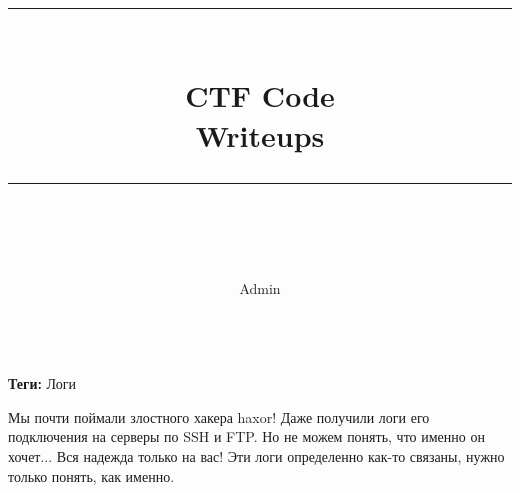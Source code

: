 \documentclass[idxtotoc,hyperref,openany,oneside]{files/admin} %
\newcommand{\HRule}{\rule{\linewidth}{0.5mm}} %
\begin{document}

\frontmatter %
\title{
\begin{center}
\HRule \\[0.4cm]
{\Huge \bfseries CTF Code \\[0.5cm] \Large Writeups}\\[0.4cm] %
\HRule \\[1.5cm]
\end{center}
}
\author{\Huge Admin \\ \\[2cm]} %
\maketitle

\tableofcontents

\mainmatter %












\textbf{Теги:} Логи \vspace{\baselineskip}

\begin{tcolorbox}
Мы почти поймали злостного хакера haxor! Даже получили логи его подключения на серверы по SSH и FTP. Но не можем понять, что именно он хочет... Вся надежда только на вас! Эти логи определенно как-то связаны, нужно только понять, как именно.
\end{tcolorbox}
\end{document}

